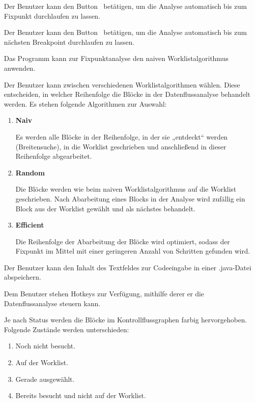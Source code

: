 Der Benutzer kann den Button  \faPlay\  betätigen, um die Analyse automatisch bis zum Fixpunkt durchlaufen zu lassen.

Der Benutzer kann den Button  \faPlay\  betätigen, um die Analyse automatisch bis zum nächsten Breakpoint durchlaufen zu lassen.

Das Programm kann zur Fixpunktanalyse den naiven Worklistalgorithmus anwenden.

Der Benutzer kann zwischen verschiedenen Worklistalgorithmen wählen.
Diese entscheiden, in welcher Reihenfolge die Blöcke in der Datenflussanalyse behandelt werden.
Es stehen folgende Algorithmen zur Auswahl:
\begin{enumerate}[label=(\alph*)]
\item \textbf{Naiv} \par
Es werden alle Blöcke in der Reihenfolge, in der sie „entdeckt“ werden (Breitensuche), in die Worklist geschrieben und anschließend in dieser Reihenfolge abgearbeitet.
\item \textbf{Random} \par
Die Blöcke werden wie beim naiven Worklistalgorithmus auf die Worklist geschrieben. Nach Abarbeitung eines Blocks in der Analyse wird zufällig ein Block aus der Worklist gewählt und als nächstes behandelt.
\item \textbf{Efficient} \par
Die Reihenfolge der Abarbeitung der Blöcke wird optimiert, sodass der Fixpunkt im Mittel mit einer geringeren Anzahl von Schritten gefunden wird.
\end{enumerate}

Der Benutzer kann den Inhalt des Textfeldes zur Codeeingabe in einer .java-Datei abspeichern.

Dem Benutzer stehen Hotkeys zur Verfügung, mithilfe derer er die Datenflussanalyse steuern kann.

Je nach Status werden die Blöcke im Kontrollflussgraphen farbig hervorgehoben. Folgende Zustände werden unterschieden:
\begin{enumerate}[label=(\alph*)]
\item Noch nicht besucht.
\item Auf der Worklist.
\item Gerade ausgewählt.
\item Bereits besucht und nicht auf der Worklist.
\end{enumerate}

